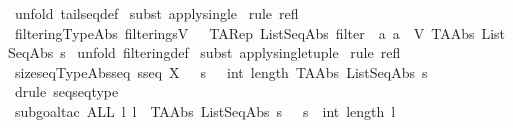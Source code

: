 \begin{isabellebody}
%
\isadelimproof
%
\endisadelimproof
%
\isatagproof
{}\isamarkupfalse%
\ {\isacharparenleft}unfold\ tailseq{\isacharunderscore}def{\isacharparenright}\isanewline
{}\isamarkupfalse%
\ {\isacharparenleft}subst\ apply{\isacharunderscore}single{\isacharparenright}\isanewline
{}\isamarkupfalse%
\ {\isacharparenleft}rule\ refl{\isacharparenright}\isanewline
{}\isamarkupfalse%
%
\endisatagproof
{\isafoldproof}%
%
\isadelimproof
\isanewline
%
\endisadelimproof
\isanewline
{}\isamarkupfalse%
\ filtering{\isacharunderscore}TypeAbs{\isacharcolon}\ {\isachardoublequoteopen}{\isacharparenleft}filtering{\isacharpercent}{\isacharcircum}{\isacharparenleft}s{\isacharcomma}V{\isacharparenright}{\isacharparenright}\ {\isacharequal}\ \ TARep\ ListSeqAbs\ {\isacharparenleft}filter\ {\isacharparenleft}{\isacharpercent}\ a{\isachardot}\ a\ {\isacharcolon}\ V{\isacharparenright}\ {\isacharparenleft}TAAbs\ ListSeqAbs\ s{\isacharparenright}{\isacharparenright}{\isachardoublequoteclose}\isanewline
%
\isadelimproof
%
\endisadelimproof
%
\isatagproof
{}\isamarkupfalse%
\ {\isacharparenleft}unfold\ filtering{\isacharunderscore}def{\isacharparenright}\isanewline
{}\isamarkupfalse%
\ {\isacharparenleft}subst\ apply{\isacharunderscore}single{\isacharunderscore}tuple{\isacharparenright}\isanewline
{}\isamarkupfalse%
\ {\isacharparenleft}rule\ refl{\isacharparenright}\isanewline
{}\isamarkupfalse%
%
\endisatagproof
{\isafoldproof}%
%
\isadelimproof
\isanewline
%
\endisadelimproof
\isanewline
{}\isamarkupfalse%
\ sizeseq{\isacharunderscore}TypeAbs{\isacharunderscore}seq{\isacharcolon}\ {\isachardoublequoteopen}s{\isacharcolon}seq\ X\ {\isacharequal}{\isacharequal}{\isachargreater}\ {\isacharparenleft}{\isacharhash}\ s{\isacharparenright}\ \ {\isacharequal}\ int\ {\isacharparenleft}length\ {\isacharparenleft}TAAbs\ ListSeqAbs\ s{\isacharparenright}{\isacharparenright}{\isachardoublequoteclose}\isanewline
%
\isadelimproof
%
\endisadelimproof
%
\isatagproof
{}\isamarkupfalse%
\ {\isacharparenleft}drule\ seq{\isacharunderscore}seqtype{\isacharparenright}\isanewline
{}\isamarkupfalse%
\ {\isacharparenleft}subgoal{\isacharunderscore}tac\ {\isachardoublequoteopen}ALL\ l{\isachardot}\ l\ {\isacharequal}\ {\isacharparenleft}TAAbs\ ListSeqAbs\ s{\isacharparenright}\ {\isacharminus}{\isacharminus}{\isachargreater}\ {\isacharparenleft}{\isacharhash}\ s{\isacharparenright}\ {\isacharequal}\ int\ {\isacharparenleft}length\ l{\isacharparenright}\ {\isachardoublequoteclose}{\isacharparenright}\isanewline

\end{isabellebody}

